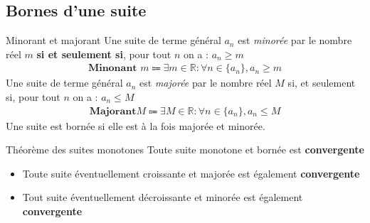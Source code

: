 \documentclass[16pt]{report}
\begin{document}
\begin{multicols*}{2}
    \section{Bornes d'une suite}
    \begin{Definitionx}{Minorant et majorant}{}
      Une suite de terme général $a_n$ est \emph{minorée} par le 
      nombre réel $m$ \textbf{si et seulement si}, pour tout $n$ on a :
      $a_n \geq m$
       \begin{align*}
           \textbf{Minonant } m \Coloneqq 
           \exists m \in \mathbb{R} : \forall n \in \{ a_n \}, 
           a_n \geq m
       \end{align*}
       Une suite de terme général $a_n$ est \emph{majorée} par le nombre 
       réel $M$ si, et seulement si, pour tout $n$ on a :
       $a_n \leq M$
       \begin{align*}
           \textbf{Majorant} M \Coloneqq 
           \exists M \in \mathbb{R} : \forall n \in \{ a_n \}, 
           a_n \leq M
       \end{align*}
       Une suite est bornée si elle est à la fois majorée et minorée. 
    \end{Definitionx}

    \begin{Theorem}{Théorème des suites monotones}{}
        Toute suite monotone et bornée est \textbf{convergente}  
    \end{Theorem}


    \begin{Lemme}{}{}
        \begin{itemize}
            \item Toute suite éventuellement croissante et majorée 
        est également \textbf{convergente}  
            \item Tout suite éventuellement décroissante et 
            minorée est également \textbf{convergente}  
        \end{itemize}
    
    \end{Lemme}


\end{multicols*}
\end{document}
